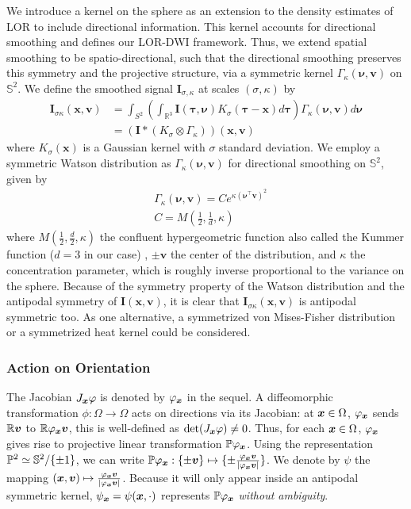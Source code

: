 \documentclass[twocolumn]{svjour3}
\begin{document}
We introduce a kernel on the sphere as an extension to the density estimates of LOR to
include directional information. This kernel accounts for directional smoothing and
defines our LOR-DWI framework.  Thus, we extend spatial smoothing to be
spatio-directional, such that the directional smoothing preserves this symmetry and the
projective structure, via a symmetric kernel $\Gamma_\kappa(\bm \nu,\bm v)$ on
$\mathbb{S}^2$. We define the smoothed signal $\bm I_{\sigma,\kappa}$ at scales
$(\sigma,\kappa)$ by
\begin{align}
  \bm I_{\sigma\kappa}(\bm x,\bm v)&=\label{eq:vecfieldsmooth}
      \int_{S^2} \left( \int_{\mathbb R^3} \bm I(\bm \tau,\bm \nu)K_\sigma(\bm \tau-\bm x)d\bm \tau\right) 
     \Gamma_{\kappa}(\bm \nu, \bm v) d\bm \nu\nonumber\\&=(\bm I*(K_{\sigma}\otimes \Gamma_{\kappa}))(\bm x,\bm v)
\end{align}
where $K_\sigma(\bm x)$ is a Gaussian kernel with $\sigma$ standard deviation.  We employ
a symmetric Watson distribution \cite{jupp1989unified} as $\Gamma_{\kappa}(\bm \nu,\bm v)$
for directional smoothing on $\mathbb S^2$, given by
\begin{align}
&\Gamma_\kappa(\bm \nu,\bm v)=Ce^{\kappa({\bm \nu}^\top \bm v)^2}\\ &C=M(\frac{1}{2},\frac{1}{d},\kappa)
\end{align}
where $M(\frac12,\frac{d}2,\kappa)$ the confluent hypergeometric function also called the
Kummer function ($d=3$ in our case) \cite{AbramowitzStegun1974}, $\pm\bm v$ the center of
the distribution, and $\kappa$ the concentration parameter, which is roughly inverse
proportional to the variance on the sphere. Because of the symmetry property of the Watson
distribution and the antipodal symmetry of $\bm I(\bm x,\bm v)$, it is clear that
$\bm I_{\sigma\kappa}(\bm x,\bm v)$ is antipodal symmetric too. As one alternative, a
symmetrized von Mises-Fisher \cite{jupp1989unified} distribution or a symmetrized heat
kernel could be considered.

\subsubsection{Action on Orientation}
The Jacobian $J_{\boldsymbol{x}}\varphi$ is denoted by $\varphi_{\boldsymbol{x}}$ in the sequel.
A diffeomorphic transformation $\phi:\Omega\to \Omega$ acts on directions via its Jacobian: at
$\boldsymbol{x}\in \Omega$, $\varphi_{\boldsymbol{x}}$ sends ${\mathbb R}\boldsymbol{v}$ to ${\mathbb R} \varphi_{\boldsymbol{x}} \boldsymbol{v}$, this is 
well-defined as $\det(J_{\boldsymbol{x}}\varphi)\not = 0$. Thus, for each $\boldsymbol{x}\in \Omega$,  $\varphi_{\boldsymbol{x}}$ gives rise to projective 
linear transformation ${\mathbb P}\varphi_{\boldsymbol{x}}$. Using the representation
${\mathbb P}^2\simeq {\mathbb S}^2/\{\pm1\}$, we can write
${\mathbb P}\varphi_{\boldsymbol{x}}:\{\pm \boldsymbol{v}\} \mapsto \{\pm\frac{\varphi_{\boldsymbol{x}}\boldsymbol{v}}{|\varphi_{\boldsymbol{x}}\boldsymbol{v}|}\}$.
We denote by $\psi$ the mapping
$(\boldsymbol{x},\boldsymbol{v})\mapsto \frac{\varphi_{\boldsymbol{x}}\boldsymbol{v}}{|\varphi_{\boldsymbol{x}}\boldsymbol{v}|}$. Because it will only
appear inside an antipodal symmetric kernel, $\psi_{\boldsymbol{x}} = \psi(\boldsymbol{x},\cdot)$ represents
${\mathbb P}{\varphi_{\boldsymbol{x}}}$ \emph{without ambiguity}.
\end{document}
